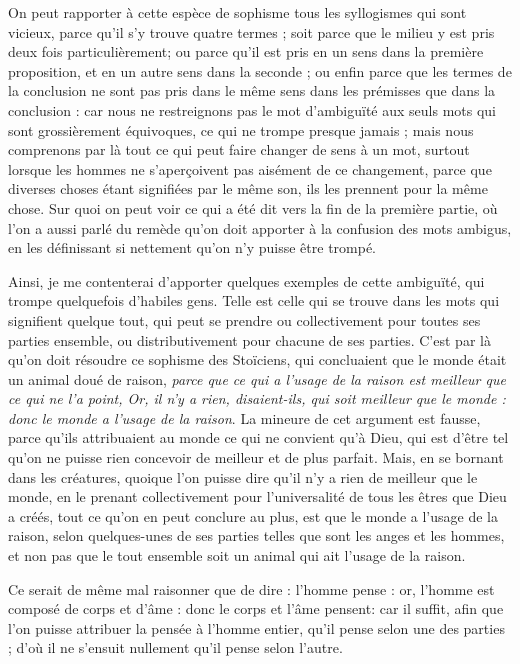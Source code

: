 On peut rapporter à cette espèce de sophisme tous les syllogismes qui sont vicieux, parce qu'il s'y trouve quatre termes ; soit parce que le milieu y est pris deux fois particulièrement; ou parce qu'il est pris en un sens dans la première proposition, et en un autre sens dans la seconde ; ou enfin parce que les termes de la conclusion ne sont pas pris dans le même sens dans les prémisses que dans la conclusion : car nous ne restreignons pas le mot d'ambiguïté aux seuls mots qui sont grossièrement équivoques, ce qui ne trompe presque jamais ; mais nous comprenons par là tout ce qui peut faire changer de sens à un mot, surtout lorsque les hommes ne s'aperçoivent pas aisément de ce changement, parce que diverses choses étant signifiées par le même son, ils les prennent pour la même chose. Sur quoi on peut voir ce qui a été dit vers la fin de la première partie, où l'on a aussi parlé du remède qu'on doit apporter à la confusion des mots ambigus, en les définissant si nettement qu'on n'y puisse être trompé.

Ainsi, je me contenterai d'apporter quelques exemples de cette ambiguïté, qui trompe quelquefois d'habiles gens. Telle est celle qui se trouve dans les mots qui signifient quelque tout, qui peut se prendre ou collectivement pour toutes ses parties ensemble, ou distributivement pour chacune de ses parties. C'est par là qu'on doit résoudre ce sophisme des Stoïciens, qui concluaient que le monde était un animal doué de raison, \emph{parce que ce qui a l'usage de la raison est meilleur que ce qui ne l'a point, Or, il n'y a rien, disaient-ils, qui soit meilleur que le monde : donc le monde a l'usage de la raison}. La mineure de cet argument est fausse, parce qu'ils attribuaient au monde ce qui ne convient qu'à Dieu, qui est d'être tel qu'on ne puisse rien concevoir de meilleur et de plus parfait. Mais, en se bornant dans les créatures, quoique l'on puisse dire qu'il n'y a rien de meilleur que le monde, en le prenant collectivement pour l'universalité de tous les êtres que Dieu a créés, tout ce qu'on en peut conclure au plus, est que le monde a l'usage de la raison, selon quelques-unes de ses parties telles que sont les anges et les hommes, et non pas que le tout ensemble soit un animal qui ait l'usage de la raison.

Ce serait de même mal raisonner que de dire : l'homme pense : or, l'homme est composé de corps et d'âme : donc le corps et l'âme pensent: car il suffit, afin que l'on puisse attribuer la pensée à l'homme entier, qu'il pense selon une des parties ; d'où il ne s'ensuit nullement qu'il pense selon l'autre.


